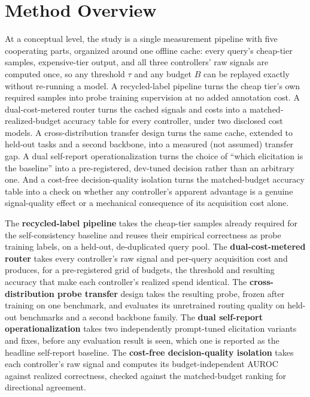 \documentclass[11pt]{article}
\begin{document}
\section{Method Overview}

At a conceptual level, the study is a single measurement pipeline with five cooperating parts, organized around one offline cache: every query's cheap-tier samples, expensive-tier output, and all three controllers' raw signals are computed once, so any threshold $\tau$ and any budget $B$ can be replayed exactly without re-running a model. A recycled-label pipeline turns the cheap tier's own required samples into probe training supervision at no added annotation cost. A dual-cost-metered router turns the cached signals and costs into a matched-realized-budget accuracy table for every controller, under two disclosed cost models. A cross-distribution transfer design turns the same cache, extended to held-out tasks and a second backbone, into a measured (not assumed) transfer gap. A dual self-report operationalization turns the choice of ``which elicitation is the baseline'' into a pre-registered, dev-tuned decision rather than an arbitrary one. And a cost-free decision-quality isolation turns the matched-budget accuracy table into a check on whether any controller's apparent advantage is a genuine signal-quality effect or a mechanical consequence of its acquisition cost alone.

The \textbf{recycled-label pipeline} takes the cheap-tier samples already required for the self-consistency baseline and reuses their empirical correctness as probe training labels, on a held-out, de-duplicated query pool. The \textbf{dual-cost-metered router} takes every controller's raw signal and per-query acquisition cost and produces, for a pre-registered grid of budgets, the threshold and resulting accuracy that make each controller's realized spend identical. The \textbf{cross-distribution probe transfer} design takes the resulting probe, frozen after training on one benchmark, and evaluates its unretrained routing quality on held-out benchmarks and a second backbone family. The \textbf{dual self-report operationalization} takes two independently prompt-tuned elicitation variants and fixes, before any evaluation result is seen, which one is reported as the headline self-report baseline. The \textbf{cost-free decision-quality isolation} takes each controller's raw signal and computes its budget-independent AUROC against realized correctness, checked against the matched-budget ranking for directional agreement.
\end{document}

